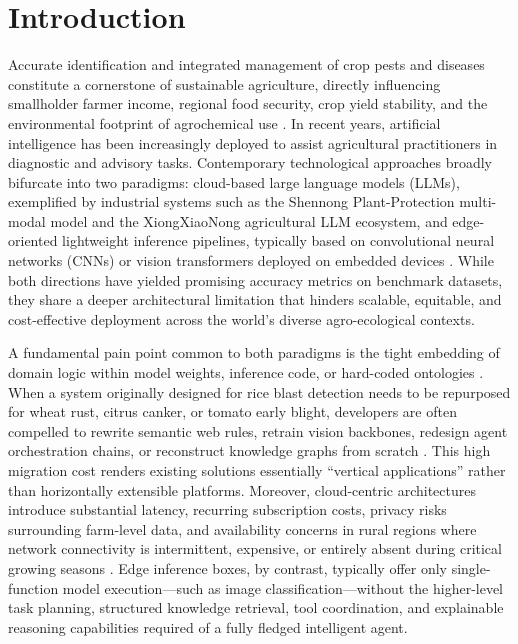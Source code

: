 \section{Introduction}

Accurate identification and integrated management of crop pests and diseases constitute a cornerstone of sustainable agriculture, directly influencing smallholder farmer income, regional food security, crop yield stability, and the environmental footprint of agrochemical use \cite{jearanaiwongkul2021riceman}. In recent years, artificial intelligence has been increasingly deployed to assist agricultural practitioners in diagnostic and advisory tasks. Contemporary technological approaches broadly bifurcate into two paradigms: cloud-based large language models (LLMs), exemplified by industrial systems such as the Shennong Plant-Protection multi-modal model \cite{wang2024shennong} and the XiongXiaoNong agricultural LLM ecosystem, and edge-oriented lightweight inference pipelines, typically based on convolutional neural networks (CNNs) or vision transformers deployed on embedded devices \cite{chatdemeter2025}. While both directions have yielded promising accuracy metrics on benchmark datasets, they share a deeper architectural limitation that hinders scalable, equitable, and cost-effective deployment across the world's diverse agro-ecological contexts.

A fundamental pain point common to both paradigms is the tight embedding of domain logic within model weights, inference code, or hard-coded ontologies \cite{alharbi2024agrodss}. When a system originally designed for rice blast detection needs to be repurposed for wheat rust, citrus canker, or tomato early blight, developers are often compelled to rewrite semantic web rules, retrain vision backbones, redesign agent orchestration chains, or reconstruct knowledge graphs from scratch \cite{agenticgraphrag2025}. This high migration cost renders existing solutions essentially ``vertical applications'' rather than horizontally extensible platforms. Moreover, cloud-centric architectures introduce substantial latency, recurring subscription costs, privacy risks surrounding farm-level data, and availability concerns in rural regions where network connectivity is intermittent, expensive, or entirely absent during critical growing seasons \cite{kleppmann2021localfirst}. Edge inference boxes, by contrast, typically offer only single-function model execution---such as image classification---without the higher-level task planning, structured knowledge retrieval, tool coordination, and explainable reasoning capabilities required of a fully fledged intelligent agent.

